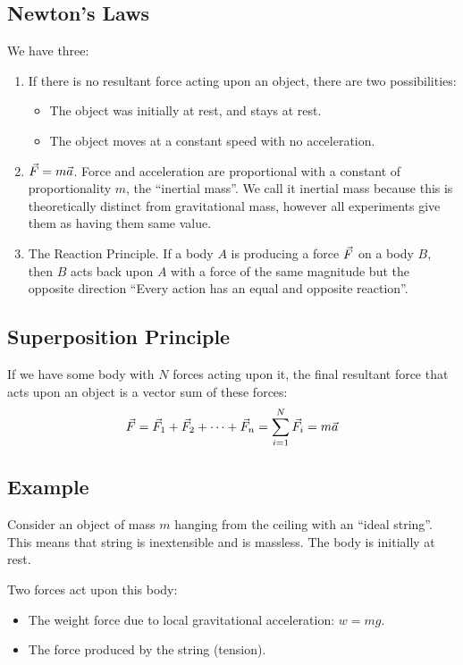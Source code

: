 \subsection{Newton's Laws}
We have three:
\begin{enumerate}
    \item If there is no resultant force acting upon an object, there are two possibilities:
    \begin{itemize}
        \item The object was initially at rest, and stays at rest.
        \item The object moves at a constant speed with no acceleration.
    \end{itemize}
    \item $\vec{F} = m \vec{a}$. Force and acceleration are proportional with a constant of proportionality $m$, the ``inertial mass''. We call it inertial mass because this is theoretically distinct from gravitational mass, however all experiments give them as having them same value. 
    \item The Reaction Principle. If a body $A$ is producing a force $\vec{F}$ on a body $B$, then $B$ acts back upon $A$ with a force of the same magnitude but the opposite direction ``Every action has an equal and opposite reaction''.
\end{enumerate}

\subsection{Superposition Principle}
If we have some body with $N$ forces acting upon it, the final resultant force that acts upon an object is a vector sum of these forces:
\[
    \vec{F} = \vec{F}_1 + \vec{F}_2 + \cdots + \vec{F}_n = \sum_{i=1}^{N} \vec{F}_i = m \vec{a}
\]

\subsection{Example}
Consider an object of mass $m$ hanging from the ceiling with an ``ideal string''. This means that string is inextensible and is massless. The body is initially at rest.

Two forces act upon this body:
\begin{itemize}
    \item The weight force due to local gravitational acceleration: $w = m g$.
    \item The force produced by the string (tension).
\end{itemize}

